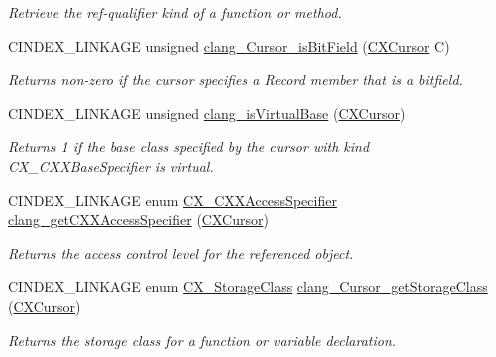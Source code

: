 \begin{DoxyCompactItemize}
\begin{DoxyCompactList}\small\item\em Retrieve the ref-\/qualifier kind of a function or method. \end{DoxyCompactList}\item 
\mbox{\label{group__CINDEX__TYPES_ga750705f6b418b25ca00495b7392c740d}} 
C\+I\+N\+D\+E\+X\+\_\+\+L\+I\+N\+K\+A\+GE unsigned \hyperlink{group__CINDEX__TYPES_ga750705f6b418b25ca00495b7392c740d}{clang\+\_\+\+Cursor\+\_\+is\+Bit\+Field} (\hyperlink{structCXCursor}{C\+X\+Cursor} C)
\begin{DoxyCompactList}\small\item\em Returns non-\/zero if the cursor specifies a Record member that is a bitfield. \end{DoxyCompactList}\item 
\mbox{\label{group__CINDEX__TYPES_ga1e3db635bc5615910f9b3a2b02fe87f0}} 
C\+I\+N\+D\+E\+X\+\_\+\+L\+I\+N\+K\+A\+GE unsigned \hyperlink{group__CINDEX__TYPES_ga1e3db635bc5615910f9b3a2b02fe87f0}{clang\+\_\+is\+Virtual\+Base} (\hyperlink{structCXCursor}{C\+X\+Cursor})
\begin{DoxyCompactList}\small\item\em Returns 1 if the base class specified by the cursor with kind C\+X\+\_\+\+C\+X\+X\+Base\+Specifier is virtual. \end{DoxyCompactList}\item 
C\+I\+N\+D\+E\+X\+\_\+\+L\+I\+N\+K\+A\+GE enum \hyperlink{group__CINDEX__TYPES_ga26763f9b0b167116c047e2ef4f221c5f}{C\+X\+\_\+\+C\+X\+X\+Access\+Specifier} \hyperlink{group__CINDEX__TYPES_gab5a250699f7d0ad95810891c7926f83d}{clang\+\_\+get\+C\+X\+X\+Access\+Specifier} (\hyperlink{structCXCursor}{C\+X\+Cursor})
\begin{DoxyCompactList}\small\item\em Returns the access control level for the referenced object. \end{DoxyCompactList}\item 
C\+I\+N\+D\+E\+X\+\_\+\+L\+I\+N\+K\+A\+GE enum \hyperlink{group__CINDEX__TYPES_ga03a15eaa53465d7f3ce7d88743241d7e}{C\+X\+\_\+\+Storage\+Class} \hyperlink{group__CINDEX__TYPES_ga230c7904f3878469d772f3e464b9c83d}{clang\+\_\+\+Cursor\+\_\+get\+Storage\+Class} (\hyperlink{structCXCursor}{C\+X\+Cursor})
\begin{DoxyCompactList}\small\item\em Returns the storage class for a function or variable declaration. \end{DoxyCompactList}\item 

\end{DoxyCompactItemize}
